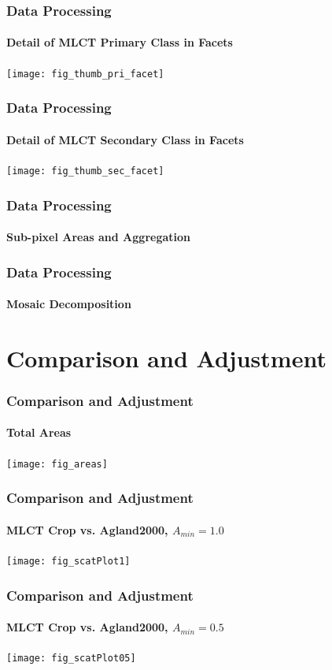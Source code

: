 \documentclass{beamer}
\begin{document}
\begin{frame}
  \frametitle{Data Processing}
  \framesubtitle{Detail of MLCT Primary Class in Facets}
  \begin{center}
    \texttt{[image: fig\_thumb\_pri\_facet]}
  \end{center}
\end{frame}

\begin{frame}
  \frametitle{Data Processing}
  \framesubtitle{Detail of MLCT Secondary Class in Facets}
  \begin{center}
    \texttt{[image: fig\_thumb\_sec\_facet]}
  \end{center}
\end{frame}

\begin{frame}
  \frametitle{Data Processing}
  \framesubtitle{Sub-pixel Areas and Aggregation}
\end{frame}

\begin{frame}
  \frametitle{Data Processing}
  \framesubtitle{Mosaic Decomposition}
\end{frame}


\section{Comparison and Adjustment}
\label{sec:analysis}

\begin{frame}
  \frametitle{Comparison and Adjustment}
  \framesubtitle{Total Areas}
  \begin{center}
    \texttt{[image: fig\_areas]}    
  \end{center}
\end{frame}

\begin{frame}[label=scatPlot1]
  \frametitle{Comparison and Adjustment}
  \framesubtitle{MLCT Crop vs. Agland2000, $A_{min}=1.0$}
  \begin{center}
    \texttt{[image: fig\_scatPlot1]}    
  \end{center}
\end{frame}

\begin{frame}[label=scatPlot05]
  \frametitle{Comparison and Adjustment}
  \framesubtitle{MLCT Crop vs. Agland2000, $A_{min}=0.5$}
  \begin{center}
    \texttt{[image: fig\_scatPlot05]}    
  \end{center}
\end{frame}
\end{document}
